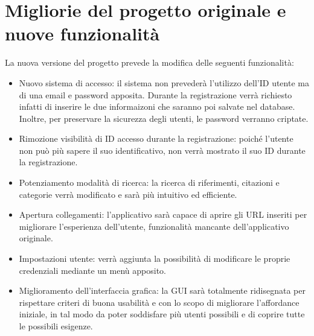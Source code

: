 \raggedright{\section{Migliorie del progetto originale e nuove funzionalità}}
La nuova versione del progetto prevede la modifica delle seguenti funzionalità:
\begin{itemize}
    \item Nuovo sistema di accesso: il sistema non prevederà l'utilizzo dell'ID utente ma di una email e password apposita. Durante la registrazione verrà richiesto infatti di inserire le due informaizoni che saranno poi salvate nel database. Inoltre, per preservare la sicurezza degli utenti, le password verranno criptate.
    \item Rimozione visibilità di ID accesso durante la registrazione: poiché l'utente non può più sapere il suo identificativo, non verrà mostrato il suo ID durante la registrazione.
    \item Potenziamento modalità di ricerca: la ricerca di riferimenti, citazioni e categorie verrà modificato e sarà più intuitivo ed efficiente.
    \item Apertura collegamenti: l'applicativo sarà capace di aprire gli URL inseriti per migliorare l'esperienza dell'utente, funzionalità mancante dell'applicativo originale.
    \item Impostazioni utente: verrà aggiunta la possibilità di modificare le proprie credenziali mediante un menù apposito.
    \item Miglioramento dell'interfaccia grafica: la GUI sarà totalmente ridisegnata per rispettare criteri di buona usabilità e con lo scopo di migliorare l'affordance iniziale, in tal modo da poter soddisfare più utenti possibili e di coprire tutte le possibili esigenze.
\end{itemize}
